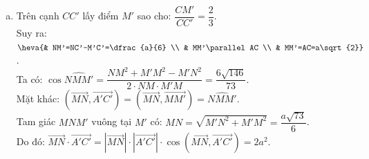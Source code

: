 \begin{ex}
{\begin{enumerate}[a)]
			      Do đó: $\vec{AN}\cdot  \vec{AC}=\left| \vec{AN} \right| \cdot  \left| \vec{AC} \right| \cdot  \cos \left(\vec{AN},\vec{AC}\right)=\dfrac{3a}{2} \cdot  a\sqrt{2} \cdot  \dfrac{2\sqrt{2}}{3}=2a^2$.
			\item Trên cạnh $CC'$ lấy điểm $M'$ sao cho: $\dfrac{CM'}{CC'}=\dfrac{2}{3}$.\\
			      Suy ra: $\heva{& NM'=NC'-M'C'=\dfrac{a}{6} \\ & MM'\parallel AC \\ & MM'=AC=a\sqrt{2}} $.\\
			      Ta có: $\cos \widehat{NMM'}=\dfrac{NM^2+M'M^2-M'N^2}{2 \cdot  NM \cdot  M'M}=\dfrac{6\sqrt{146}}{73}$.\\
			      Mặt khác: $\left(\vec{MN},\vec{A'C'}\right)=\left(\vec{MN},\vec{MM'}\right)=\widehat{NMM'}$.\\
			      Tam giác $MNM'$ vuông tại $M'$ có: $MN=\sqrt{M'N^2+M'M^2}=\dfrac{a\sqrt{73}}{6}$.\\
			      Do đó: $\vec{MN}\cdot  \vec{A'C'}=\left| \vec{MN} \right| \cdot  \left| \vec{A'C'} \right| \cdot  \cos \left(\vec{MN},\vec{A'C'}\right)=2a^2$.
		\end{enumerate}
	}
\end{ex}
